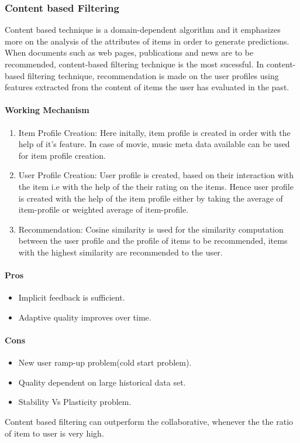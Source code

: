 \subsubsection{Content based Filtering}
Content based technique \cite{recommend} is a domain-dependent algorithm and it emphasizes more on the analysis of the attributes of items in order to generate predictions. When documents such as web pages, publications and news are to be recommended, content-based filtering technique is the most sucessful. In content-based filtering technique, recommendation is made on the user profiles using features extracted from the content of items the user has evaluated in the past. 
\paragraph{Working Mechanism}\hfill

\begin{enumerate}
	\item Item Profile Creation: Here initally, item profile is created in order with the help of it's feature. In case of movie, music meta data available can be used for item profile creation.
	\item User Profile Creation: User profile is created, based on their interaction with the item i.e with the help of the their rating on the items. Hence user profile is created with the help of the item profile either by taking the average of item-profile or weighted average of item-profile.
	\item Recommendation: Cosine similarity is used for the similarity computation between the user profile and the profile of items to be recommended, items with the highest similarity are recommended to the user. 
\end{enumerate}

\paragraph{Pros}\hfill
\begin{itemize}
\item Implicit feedback is sufficient.
\item Adaptive quality improves over time.
\end{itemize}
\paragraph{Cons}\hfill
\begin{itemize}
\item New user ramp-up problem(cold start problem).
\item Quality dependent on large historical data set.
\item Stability Vs Plasticity problem.

\end{itemize}
Content based filtering can outperform the collaborative, whenever the the ratio of item to user is very high.
